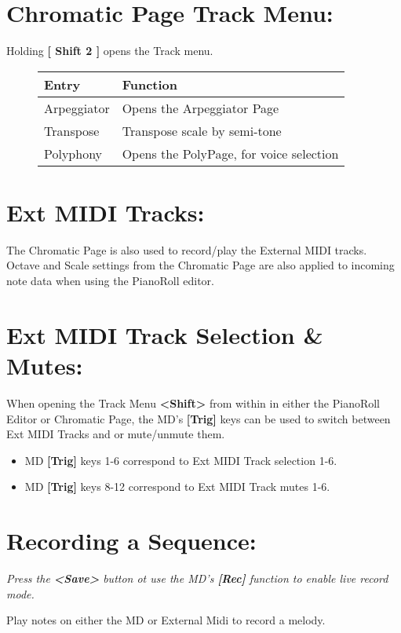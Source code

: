 \section{Chromatic Page Track Menu:}
Holding \textbf{[ Shift 2 ]} opens the Track menu.
\begin{figure}[hb]
    \begin{tabular}{|l|l|}
    \hline
    \rowcolor[HTML]{C0C0C0} 
    Entry            & Function \\ \hline
    Arpeggiator      & Opens the Arpeggiator Page \\ \hline
    Transpose        & Transpose scale by semi-tone\\ \hline
    Polyphony        & Opens the PolyPage, for voice selection\\ \hline
    \end{tabular}
\end{figure}
\newpage
\section{Ext MIDI Tracks:}
The Chromatic Page is also used to record/play the External MIDI tracks.
Octave and Scale settings from the Chromatic Page are also applied to incoming note data when using the PianoRoll editor.
\section{Ext MIDI Track Selection \& Mutes:}
When opening the Track Menu \textbf{<Shift>} from within in either the PianoRoll Editor or Chromatic Page, the MD's \textbf{[Trig]} keys can be used to switch between Ext MIDI Tracks and or  mute/unmute them.
\begin{itemize}
    \item MD \textbf{[Trig]} keys 1-6 correspond to Ext MIDI Track selection 1-6.
    \item MD \textbf{[Trig]} keys 8-12 correspond to Ext MIDI Track mutes 1-6.
\end{itemize}
\section{Recording a Sequence:}
\textit{Press the \textbf{<Save>} button ot use the MD's \textbf{[Rec]} function to enable live record mode.\\}

Play notes on either the MD or External Midi to record a melody.

